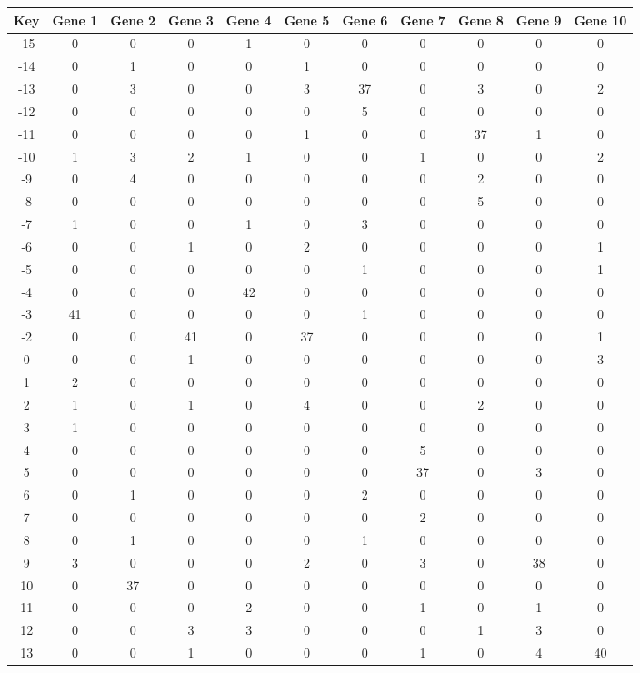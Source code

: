 \begin{tabular}{|c|c|c|c|c|c|c|c|c|c|c|}
\hline
Key & Gene 1 & Gene 2 & Gene 3 & Gene 4 & Gene 5 & Gene 6 & Gene 7 & Gene 8 & Gene 9 & Gene 10 \\
\hline
-15 & 0 & 0 & 0 & 1 & 0 & 0 & 0 & 0 & 0 & 0 \\
-14 & 0 & 1 & 0 & 0 & 1 & 0 & 0 & 0 & 0 & 0 \\
-13 & 0 & 3 & 0 & 0 & 3 & 37 & 0 & 3 & 0 & 2 \\
-12 & 0 & 0 & 0 & 0 & 0 & 5 & 0 & 0 & 0 & 0 \\
-11 & 0 & 0 & 0 & 0 & 1 & 0 & 0 & 37 & 1 & 0 \\
-10 & 1 & 3 & 2 & 1 & 0 & 0 & 1 & 0 & 0 & 2 \\
-9 & 0 & 4 & 0 & 0 & 0 & 0 & 0 & 2 & 0 & 0 \\
-8 & 0 & 0 & 0 & 0 & 0 & 0 & 0 & 5 & 0 & 0 \\
-7 & 1 & 0 & 0 & 1 & 0 & 3 & 0 & 0 & 0 & 0 \\
-6 & 0 & 0 & 1 & 0 & 2 & 0 & 0 & 0 & 0 & 1 \\
-5 & 0 & 0 & 0 & 0 & 0 & 1 & 0 & 0 & 0 & 1 \\
-4 & 0 & 0 & 0 & 42 & 0 & 0 & 0 & 0 & 0 & 0 \\
-3 & 41 & 0 & 0 & 0 & 0 & 1 & 0 & 0 & 0 & 0 \\
-2 & 0 & 0 & 41 & 0 & 37 & 0 & 0 & 0 & 0 & 1 \\
0 & 0 & 0 & 1 & 0 & 0 & 0 & 0 & 0 & 0 & 3 \\
1 & 2 & 0 & 0 & 0 & 0 & 0 & 0 & 0 & 0 & 0 \\
2 & 1 & 0 & 1 & 0 & 4 & 0 & 0 & 2 & 0 & 0 \\
3 & 1 & 0 & 0 & 0 & 0 & 0 & 0 & 0 & 0 & 0 \\
4 & 0 & 0 & 0 & 0 & 0 & 0 & 5 & 0 & 0 & 0 \\
5 & 0 & 0 & 0 & 0 & 0 & 0 & 37 & 0 & 3 & 0 \\
6 & 0 & 1 & 0 & 0 & 0 & 2 & 0 & 0 & 0 & 0 \\
7 & 0 & 0 & 0 & 0 & 0 & 0 & 2 & 0 & 0 & 0 \\
8 & 0 & 1 & 0 & 0 & 0 & 1 & 0 & 0 & 0 & 0 \\
9 & 3 & 0 & 0 & 0 & 2 & 0 & 3 & 0 & 38 & 0 \\
10 & 0 & 37 & 0 & 0 & 0 & 0 & 0 & 0 & 0 & 0 \\
11 & 0 & 0 & 0 & 2 & 0 & 0 & 1 & 0 & 1 & 0 \\
12 & 0 & 0 & 3 & 3 & 0 & 0 & 0 & 1 & 3 & 0 \\
13 & 0 & 0 & 1 & 0 & 0 & 0 & 1 & 0 & 4 & 40 \\
\hline
\end{tabular}